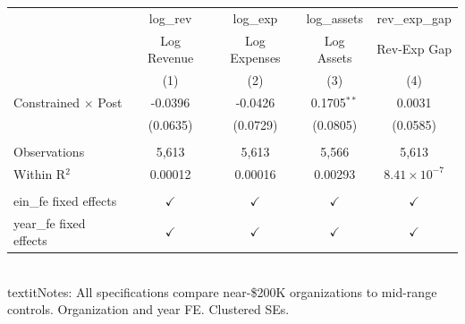 \begingroup
\centering
\begin{tabular}{lcccc}
   \toprule
                              & log\_rev      & log\_exp      & log\_assets   & rev\_exp\_gap\\    
                              & Log Revenue   & Log Expenses  & Log Assets    & Rev-Exp Gap \\   
                              & (1)           & (2)           & (3)           & (4)\\  
   \midrule 
   Constrained $\times$ Post  & -0.0396       & -0.0426       & 0.1705$^{**}$ & 0.0031\\   
                              & (0.0635)      & (0.0729)      & (0.0805)      & (0.0585)\\   
    \\
   Observations               & 5,613         & 5,613         & 5,566         & 5,613\\  
   Within R$^2$               & 0.00012       & 0.00016       & 0.00293       & $8.41\times 10^{-7}$\\   
    \\
   ein\_fe fixed effects      & $\checkmark$  & $\checkmark$  & $\checkmark$  & $\checkmark$\\   
   year\_fe fixed effects     & $\checkmark$  & $\checkmark$  & $\checkmark$  & $\checkmark$\\   
   \bottomrule
\end{tabular}
 
\par \raggedright 
\\textit{Notes:} All specifications compare near-\$200K organizations to mid-range controls. Organization and year FE. Clustered SEs.
\par\endgroup

